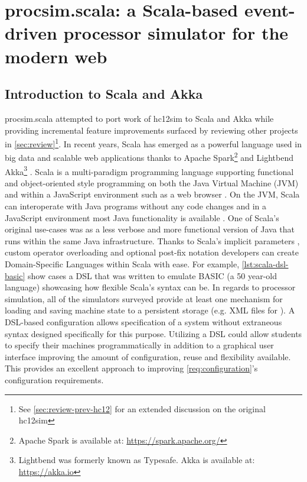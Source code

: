 \chapter{procsim.scala: a Scala-based event-driven processor simulator for the modern web}
\label{ch:scala-akka}

\newcommand{\scalainline}[1]{\texttt{#1}}
\newcommand{\akkaActor}{\scalainline{Actor}}

\section{Introduction to Scala and Akka}

procsim.scala attempted to port work of hc12sim to Scala and Akka while providing incremental feature improvements surfaced by reviewing other projects in \cref{sec:review}\footnote{See \cref{sec:review-prev-hc12} for an extended discussion on the original hc12sim}. In recent years, Scala has emerged as a powerful language used in big data and scalable web applications thanks to Apache Spark\footnote{Apache Spark is available at: \url{https://spark.apache.org/}} and Lightbend Akka\footnote{Lightbend was formerly known as Typesafe. Akka is available at: \url{https://akka.io}} \cite{Karau2015, Alexandrov2014, Singh2015}. Scala is a multi-paradigm programming language supporting functional and object-oriented style programming on both the Java Virtual Machine (JVM) and within a JavaScript environment such as a web browser \cite{Scala-Lang}. On the JVM, Scala can interoperate with Java programs without any code changes and in a JavaScript environment most Java functionality is available \cite{Scala-js2015,Doeraene2017}. One of Scala's original use-cases was as a less verbose and more functional version of Java that runs within the same Java infrastructure. Thanks to Scala's implicit parameters \cite{Scala-ImplicitParameters}, custom operator overloading \cite{Scala-Operators} and optional post-fix notation \cite{Scala-MethodInvocations} developers can create Domain-Specific Languages within Scala with ease. For example, \cref{lst:scala-dsl-basic} show cases a DSL that was written to emulate BASIC (a 50 year-old language) showcasing how flexible Scala's syntax can be. In regards to processor simulation, all of the simulators surveyed provide at least one mechanism for loading and saving machine state to a persistent storage (e.g. XML files for \cite{Skrien2001, Black2013}). A DSL-based configuration allows specification of a system without extraneous syntax designed specifically for this purpose. Utilizing a DSL could allow students to specify their machines programmatically in addition to a graphical user interface improving the amount of configuration, reuse and flexibility available. This provides an excellent approach to improving \cref{req:configuration}'s configuration requirements.

